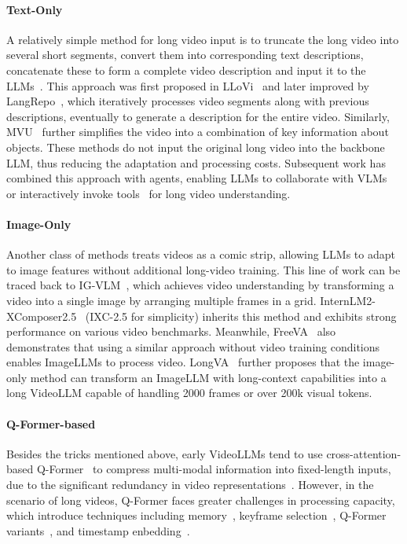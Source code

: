 \paragraph{Text-Only} A relatively simple method for long video input is to truncate the long video into several short segments, convert them into corresponding text descriptions, concatenate these to form a complete video description and input it to the LLMs~\citep{zhang2023simple}. This approach was first proposed in LLoVi~\citep{zhang2023simple} and later improved by LangRepo~\citep{kahatapitiya2024language}, which iteratively processes video segments along with previous descriptions, eventually to generate a description for the entire video. Similarly, MVU~\citep{ranasinghe2024understanding} further simplifies the video into a combination of key information about objects. These methods do not input the original long video into the backbone LLM, thus reducing the adaptation and processing costs. Subsequent work has combined this approach with agents, enabling LLMs to collaborate with VLMs~\citep{wang2025videoagent} or interactively invoke tools~\citep{fan2025videoagenttool} for long video understanding.

\paragraph{Image-Only} Another class of methods treats videos as a comic strip, allowing LLMs to adapt to image features without additional long-video training. This line of work can be traced back to IG-VLM~\citep{kim2024image}, which achieves video understanding by transforming a video into a single image by arranging multiple frames in a grid. InternLM2-XComposer2.5~\citep{zhang2024internlm} (IXC-2.5 for simplicity) inherits this method and exhibits strong performance on various video benchmarks. Meanwhile, FreeVA~\citep{wu2024freeva} also demonstrates that using a similar approach without video training conditions enables ImageLLMs to process video. LongVA~\citep{zhang2406long} further proposes that the image-only method can transform an ImageLLM with long-context capabilities into a long VideoLLM capable of handling 2000 frames or over 200k visual tokens.

\paragraph{Q-Former-based} Besides the tricks mentioned above, early VideoLLMs tend to use cross-attention-based Q-Former~\citep{li2023blip,zhang2023video,song2024moviechat} to compress multi-modal information into fixed-length inputs, due to the significant redundancy in video representations~\citep{zou2024seconds}. However, in the scenario of long videos, Q-Former faces greater challenges in processing capacity, which introduce techniques including memory~\citep{song2024moviechat}, keyframe selection~\citep{korbar2025text}, Q-Former variants~\citep{ma2023vista,ren2024timechat}, and timestamp enbedding~\citep{ren2024timechat,qianmomentor}.

